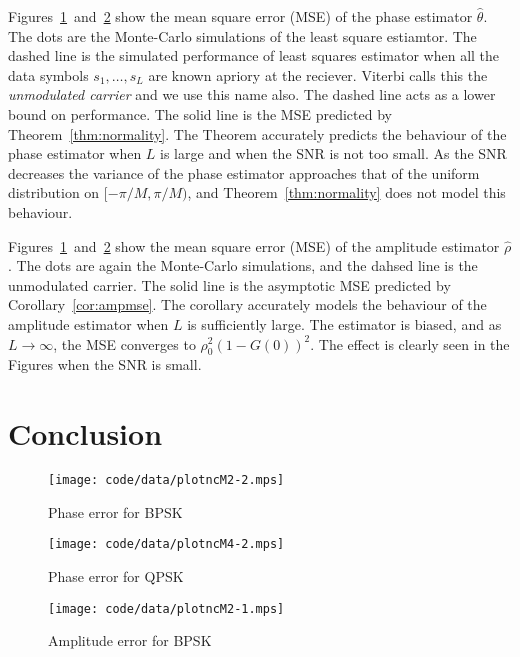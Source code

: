 \documentclass[conference]{IEEEtran}
\begin{document}
Figures~\ref{fig:plotphaseM2}~and~\ref{fig:plotphaseM4} show the mean square error (MSE) of the phase estimator $\hat{\theta}$.  The dots are the Monte-Carlo simulations of the least square estiamtor.  The dashed line is the simulated performance of least squares estimator when all the data symbols $s_1, \dots, s_L$ are known apriory at the reciever.  Viterbi calls this the \emph{unmodulated carrier} and we use this name also.  The dashed line acts as a lower bound on performance.  The solid line is the MSE predicted by Theorem~\ref{thm:normality}.  The Theorem accurately predicts the behaviour of the phase estimator when $L$ is large and when the SNR is not too small.  As the SNR decreases the variance of the phase estimator approaches that of the uniform distribution on $[-\pi/M, \pi/M)$, and Theorem~\ref{thm:normality} does not model this behaviour.

Figures~\ref{fig:plotphaseM2}~and~\ref{fig:plotphaseM4} show the mean square error (MSE) of the amplitude estimator $\hat{\rho}$.  The dots are again the Monte-Carlo simulations, and the dahsed line is the unmodulated carrier.  The solid line is the asymptotic MSE predicted by Corollary~\ref{cor:ampmse}.  The corollary accurately models the behaviour of the amplitude estimator when $L$ is sufficiently large.  The estimator is biased, and as $L\rightarrow\infty$, the MSE converges to $\rho_0^2(1 - G(0))^2$.  The effect is clearly seen in the Figures when the SNR is small.




\section{Conclusion}


\begin{figure}[p]
	\centering
		\texttt{[image: code/data/plotncM2-2.mps]}
		\caption{Phase error for BPSK}
		\label{fig:plotphaseM2}
\end{figure}

\begin{figure}[p]
	\centering
		\texttt{[image: code/data/plotncM4-2.mps]}
		\caption{Phase error for QPSK}
		\label{fig:plotphaseM4}
\end{figure}

\begin{figure}[p]
	\centering
		\texttt{[image: code/data/plotncM2-1.mps]}
		\caption{Amplitude error for BPSK}
		\label{fig:plotampM2}
\end{figure}
\end{document}
